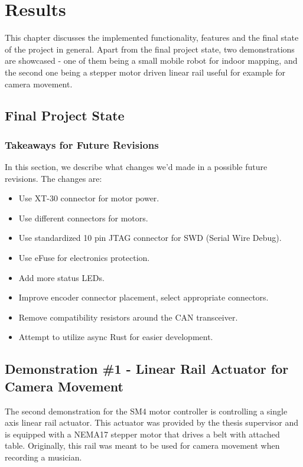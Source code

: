 \chapter{Results}
\label{ch:results}
This chapter discusses the implemented functionality, features and the final state of the project in general.
Apart from the final project state, two demonstrations are showcased - one of them being a small mobile robot for indoor mapping, and the second one being a stepper motor driven linear rail useful for example for camera movement.

\section{Final Project State}
\label{sec:final_project_state}

\subsection{Takeaways for Future Revisions}
\label{subsec:final_takeaways}
In this section, we describe what changes we'd made in a possible future revisions.
The changes are:
\begin{itemize}
    \item Use XT-30 connector for motor power.
    \item Use different connectors for motors.
    \item Use standardized 10 pin JTAG connector for SWD (Serial Wire Debug).
    \item Use eFuse for electronics protection.
    \item Add more status LEDs.
    \item Improve encoder connector placement, select appropriate connectors.
    \item Remove compatibility resistors around the CAN transceiver.
    \item Attempt to utilize async Rust for easier development.
\end{itemize}

\section{Demonstration \#1 - Linear Rail Actuator for Camera Movement}
\label{sec:dem2}
The second demonstration for the SM4 motor controller is controlling a single axis linear rail actuator.
This actuator was provided by the thesis supervisor and is equipped with a NEMA17 stepper motor that drives a belt with attached table.
Originally, this rail was meant to be used for camera movement when recording a musician.

